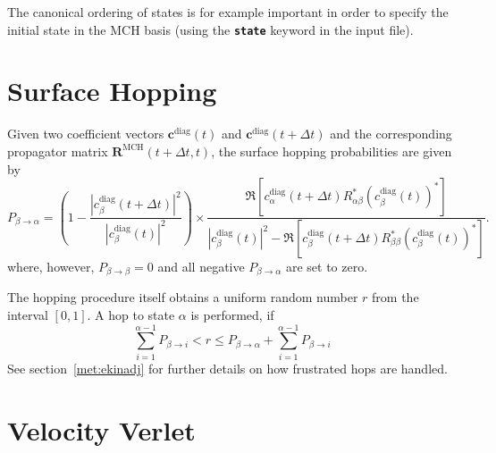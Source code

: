 \documentclass[a4paper,11pt,DIV=15,openany,twoside=false]{scrbook}
\newcommand{\ttt}[1]{\textbf{\texttt{#1}}}
\newcommand{\VEC}[1]{\ensuremath{\mathbf{#1}}}
\begin{document}
The canonical ordering of states is for example important in order to specify the initial state in the MCH basis (using the \ttt{state} keyword in the input file).


\section{Surface Hopping}

Given two coefficient vectors $\VEC{c}^{\text{diag}}(t)$ and $\VEC{c}^{\text{diag}}(t+\Delta t)$ and the corresponding propagator matrix $\VEC{R}^{\text{MCH}}(t+\Delta t,t)$, the surface hopping probabilities are given by
\begin{equation}
  P_{\beta\rightarrow\alpha}=
  \left(
    1-
    \frac{
      \left|
        c_\beta^{\text{diag}}(t+\Delta t)
      \right|^2
    }{
      \left|
        c_\beta^{\text{diag}}(t)
      \right|^2
    }\right)
    \times
    \frac{
      \Re\left[
        c^{\text{diag}}_\alpha(t+\Delta t)
        R^*_{\alpha\beta}
        \left(
          c^{\text{diag}}_\beta(t)
        \right)^*
      \right]
    }{
      \left|
        c^{\text{diag}}_\beta(t)
      \right|^2
      -\Re\left[
        c^{\text{diag}}_\beta(t+\Delta t)
        R^*_{\beta\beta}
        \left(
          c^{\text{diag}}_\beta(t)
        \right)^*
      \right]
    }.
\end{equation}
where, however, $P_{\beta\rightarrow\beta}=0$ and all negative $P_{\beta\rightarrow\alpha}$ are set to zero.

The hopping procedure itself obtains a uniform random number $r$ from the interval $[0,1]$. A hop to state $\alpha$ is performed, if
\begin{equation}
  \sum\limits_{i=1}^{\alpha-1} P_{\beta\rightarrow i} < r \le P_{\beta\rightarrow\alpha}+\sum\limits_{i=1}^{\alpha-1} P_{\beta\rightarrow i}
\end{equation}
See section~\ref{met:ekinadj} for further details on how frustrated hops are handled.


\section{Velocity Verlet}
\end{document}
